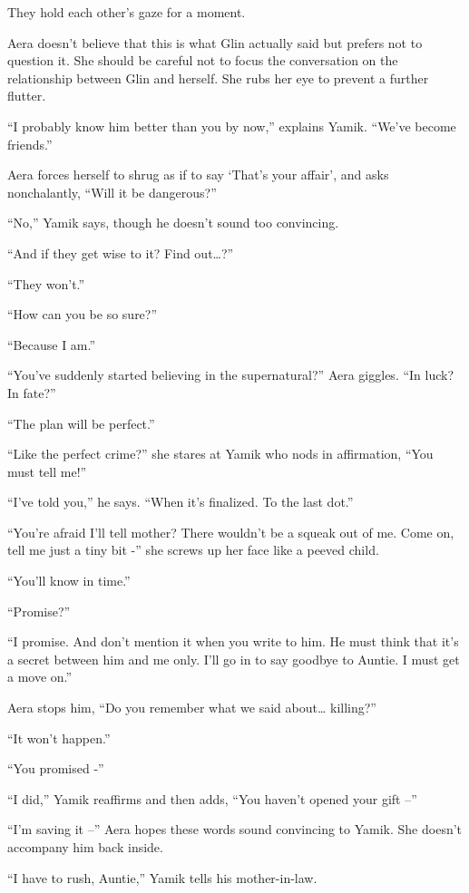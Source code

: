 \documentclass[twoside,11pt]{book}
\begin{document}
They hold each other's gaze for a moment.

Aera doesn't believe that this is what Glin actually said but prefers not to question it. She should be careful not to
focus the conversation on the relationship between Glin and herself. She rubs her eye to prevent a further flutter.

``I probably know him better than you by now,'' explains Yamik. ``We've become
friends.''

Aera forces herself to shrug as if to say `That's your affair', and asks nonchalantly, ``Will it be
dangerous?''

``No,'' Yamik says, though he doesn't sound too convincing.

``And if they get wise to it? Find out{\dots}?''

``They won't.''

``How can you be so sure?''

``Because I am.''

``You've suddenly started believing in the supernatural?'' Aera giggles. ``In
luck? In fate?''

``The plan will be perfect.''

``Like the perfect crime?'' she stares at Yamik who nods in affirmation, ``You must tell me!''


``I've told you,'' he says. ``When it's finalized.  To the last dot.''

``You're afraid I'll tell mother? There wouldn't be a squeak out of me. Come on, tell me just a tiny bit
-'' she screws up her face like a peeved child.

``You'll know in time.''

``Promise?''

``I promise. And don't mention it when you write to him. He must think that it's a secret between him and
me only. I'll go in to say goodbye to Auntie. I must get a move on.''

Aera stops him, ``Do you remember what we said about{\dots} killing?''

``It won't happen.''

``You promised -''

``I did,'' Yamik reaffirms and then adds, ``You haven't opened your gift
--''

``I'm saving it --'' Aera hopes these words sound convincing to Yamik. She doesn't accompany
him back inside.

``I have to rush, Auntie,'' Yamik tells his mother-in-law.
\end{document}
